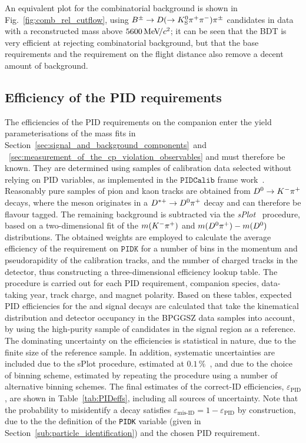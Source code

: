 An equivalent plot for the combinatorial background  is shown in Fig.~\ref{fig:comb_rel_cutflow}, using ${{B}^\pm}\rightarrow{\ensuremath{D}}(\rightarrow{\ensuremath{{K}^0_{\mathrm{S}}}}{\ensuremath{{\pi}^+}}{\ensuremath{{\pi}^-}}){{\pi}^\pm}$ candidates in data with a reconstructed \B mass above $5600\text{\,Me\kern -0.1em V\!/}c^2$; it can be seen that the BDT is very efficient at rejecting combinatorial background, but that the base requirements and the requirement on the \KS flight distance also remove a decent amount of background.



\subsection{Efficiency of the PID requirements} %
\label{sub:efficiency_of_the_pid_requirements}

The efficiencies of the PID requirements on the companion enter the yield parameterisations of the mass fits in Section~\ref{sec:signal_and_background_components}~and ~\ref{sec:measurement_of_the_cp_violation_observables} and must therefore be known. They are determined using samples of calibration data selected without relying on PID variables, as implemented in the $\texttt{PIDCalib}$ frame work~\cite{anderliniPIDCalibPackage2016}. Reasonably pure samples of pion and kaon tracks are obtained from ${{D}^0}\rightarrow{\ensuremath{{K}^-}}{\ensuremath{{\pi}^+}}$ decays, where the \D meson originates in a ${{D}^{*+}}\rightarrow{\ensuremath{{D}^0}}{\ensuremath{{\pi}^+}}$ decay and can therefore be flavour tagged. The remaining background is subtracted via the \emph{sPlot}~\cite{sPlot} procedure, based on a two-dimensional fit of the $m({{K}^-}{{\pi}^+})$ and $m({{D}^0}{{\pi}^+})-m({{D}^0})$ distributions. The obtained weights are employed to calculate the average efficiency of the requirement on $\texttt{PIDK}$ for a number of bins in the momentum and pseudorapidity of the calibration tracks, and the number of charged tracks in the detector, thus constructing a three-dimensional efficiency lookup table. The procedure is carried out for each PID requirement, companion species, data-taking year, track charge, and magnet polarity. Based on these tables, expected PID efficiencies for the \BtoDpi and \BtoDK signal decays are calculated that take the kinematical distribution and detector occupancy in the BPGGSZ data samples into account, by using the high-purity sample of \BtoDpi candidates in the signal region as a reference. The dominating uncertainty on the efficiencies is statistical in nature, due to the finite size of the reference sample. In addition, systematic uncertainties are included due to the sPlot procedure, estimated at $0.1\,\%$~\cite{anderliniPIDCalibPackage2016}, and due to the choice of binning scheme, estimated by repeating the procedure using a number of alternative binning schemes. The final estimates of the correct-ID efficiencies, $\varepsilon_\text{PID}$, are shown in Table~\ref{tab:PIDeffs}, including all sources of uncertainty. Note that the probability to misidentify a decay satisfies $\varepsilon_\text{mis-ID}=1-\varepsilon_\text{PID}$ by construction, due to the the definition of the \texttt{PIDK} variable (given in Section~\ref{sub:particle_identification}) and the chosen PID requirement.

